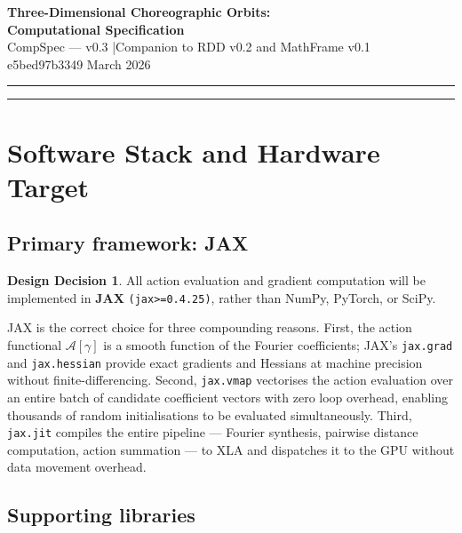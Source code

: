 \documentclass[12pt, a4paper]{article}
\theoremstyle{definition}
\newtheorem{decision}{Design Decision}
\newcommand{\Action}{\mathcal{A}}
\begin{document}
\begin{center}
  {\LARGE \textbf{Three-Dimensional Choreographic Orbits:\\[4pt]
  Computational Specification}}\\[1.6em]
  {\large \textcolor{muted}{CompSpec — v0.3 \quad|\quad Companion to RDD v0.2 and MathFrame v0.1}}\\[0.6em]
  {\normalsize \textcolor{muted}{e5bed97b3349 \quad\textbullet\quad March 2026}}
\end{center}

\vspace{1em}
\noindent\rule{\textwidth}{0.4pt}
\vspace{0.5em}

\tableofcontents

\vspace{0.5em}
\noindent\rule{\textwidth}{0.4pt}

\section{Software Stack and Hardware Target}

\subsection{Primary framework: JAX}

\begin{decision}
All action evaluation and gradient computation will be implemented in
\textbf{JAX} \texttt{(jax>=0.4.25)}, rather than NumPy, PyTorch, or SciPy.
\end{decision}

JAX is the correct choice for three compounding reasons. First, the action
functional $\Action[\gamma]$ is a smooth function of the Fourier coefficients;
JAX's \texttt{jax.grad} and \texttt{jax.hessian} provide exact gradients and
Hessians at machine precision without finite-differencing. Second,
\texttt{jax.vmap} vectorises the action evaluation over an entire batch of
candidate coefficient vectors with zero loop overhead, enabling thousands of
random initialisations to be evaluated simultaneously. Third, \texttt{jax.jit}
compiles the entire pipeline — Fourier synthesis, pairwise distance computation,
action summation — to XLA and dispatches it to the GPU without data movement
overhead.

\subsection{Supporting libraries}
\end{document}
